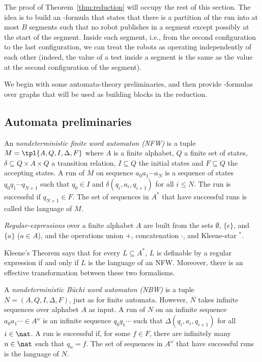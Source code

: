 The proof of Theorem~\ref{thm:reduction} will occupy the rest of this section. The idea is to build an \msol-formula that states that
there is a partition of the run into at most $B$ segments such that no robot publishes in a segment except possibly at the start of the segment. 
Inside each segment, i.e., from the second configuration to the last configuration, we can treat the robots as operating independently of each other (indeed, the value of a test inside a segment is the same as the value at the second configuration of the segment). 

We begin with some automata-theory preliminaries, and then provide \msol-formulas over graphs that will be used as building blocks in the reduction.

\subsection{Automata preliminaries}

An {\em nondeterministic finite word automaton (NFW)} is a tuple $M = \tpl{A,Q,I,\Delta,F}$ where $A$ is a finite alphabet, $Q$ a finite set of states, $\delta \subseteq Q \times A \times Q$ a transition relation, $I \subseteq Q$ the initial states and $F \subseteq Q$ the accepting states. A run of $M$ on sequence $a_0 a_1 \cdots a_N$ is a sequence of states $q_0 q_1 \cdots q_{N+1}$ such that $q_0 \in I$ and $\delta(q_i,a_i,q_{i+1})$ for all $i \leq N$. The run is successful if $q_{N+1} \in F$. The set of sequences in $A^*$ that have successful runs is called the language of $M$.

{\em Regular-expressions} over a finite alphabet $A$ are built from the 
sets $\emptyset$, $\{\epsilon\}$, and $\{a\}$ ($a \in A$), and the operations 
union $+$, concatenation $\cdot$, and Kleene-star $\phantom{}^*$.

Kleene's Theorem says that for every $L \subseteq A^*$, $L$ is definable by a regular expression if and only if $L$ is the language of an NFW.
Moreover, there is an effective transformation between these two formalisms.

A \emph{nondeterministic B\"uchi word automaton (NBW)} is a tuple $N = (A,Q,I,\Delta,F)$, just as for finite automata. However, $N$ takes infinite sequences over alphabet $A$ as input. A run of $N$ on an infinite sequence $a_0 a_1 \cdots \in A^\omega$ is an infinite sequence $q_0 q_1 \cdots$ such that $\Delta(q_i,a_i,q_{i+1})$ for all $i \in \nat$. A run is successful if, for some $f \in F$, there are infinitely many $n \in \nat$ such that $q_n = f$. The set of  sequences in $A^\omega$ that have successful runs is the language of $N$.


